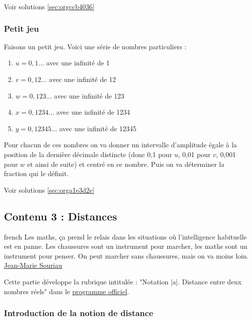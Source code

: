 \documentclass[a4paper, 11pt, twoside]{article}
\begin{document}
Voir solutions \ref{sec:orgccb4036}

\subsubsection{Petit jeu}
\label{sec:org5375956}
Faisons un petit jeu. Voici une série de nombres particuliers :
\begin{enumerate}
\item \(u = 0,1\dots\) avec une infinité de 1
\item \(v = 0,12\dots\) avec une infinité de 12
\item \(w = 0,123\dots\) avec une infinité de 123
\item \(x = 0,1234\dots\) avec une infinité de 1234
\item \(y = 0,12345\dots\) avec une infinité de 12345
\end{enumerate}

Pour chacun de ces nombres on va donner un intervalle d'amplitude
égale à la position de la dernière décimale distincte (donc 0,1
pour \(u\), 0,01 pour \(v\), 0,001 pour \(w\) et ainsi de suite) et
centré en ce nombre. Puis on va déterminer la fraction qui le
définit.

Voir solutions \ref{sec:orga1e3d2e}
\stopcontents[level-2]

\subsection{Contenu 3 : Distances}
\label{sec:org112f093}

\begin{foreigndisplayquote}{french}
Les maths, ça prend le relais dans les situations où l’intelligence
habituelle est en panne. Les chaussures sont un instrument pour
marcher, les maths sont un instrument pour penser. On peut marcher
sans chaussures, mais on va moins loin.\\
\href{https://fr.wikipedia.org/wiki/Jean-Marie\_Souriau}{Jean-Marie Souriau}
\end{foreigndisplayquote}

\startcontents[level-2]

Cette partie développe la rubrique intitulée :
"Notation |a|. Distance entre deux nombres réels" dans le
\href{https://eduscol.education.fr/document/24553/download}{programme officiel}.

\subsubsection{Introduction de la notion de distance}
\label{sec:org827c2a6}
\end{document}
